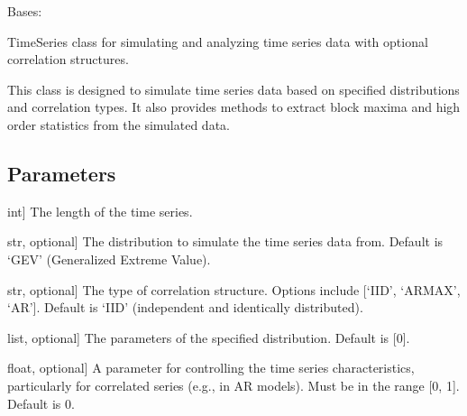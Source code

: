 \documentclass[a4paper,11pt,openany,english]{sphinxmanual}
\begin{document}
\begin{fulllineitems}
\label{\detokenize{api_topt:xtremes.topt.TimeSeries}}
\pysigstartsignatures
{}
\pysigstopsignatures
\sphinxAtStartPar
Bases: 

\sphinxAtStartPar
TimeSeries class for simulating and analyzing time series data with optional correlation structures.

\sphinxAtStartPar
This class is designed to simulate time series data based on specified distributions and correlation types. 
It also provides methods to extract block maxima and high order statistics from the simulated data.


\subsection{Parameters}
\label{\detokenize{api_topt:parameters}}\begin{description}
\sphinxlineitem{n}{[}int{]}
\sphinxAtStartPar
The length of the time series.

\sphinxlineitem{distr}{[}str, optional{]}
\sphinxAtStartPar
The distribution to simulate the time series data from. Default is ‘GEV’ (Generalized Extreme Value).

\sphinxlineitem{correlation}{[}str, optional{]}
\sphinxAtStartPar
The type of correlation structure. Options include {[}‘IID’, ‘ARMAX’, ‘AR’{]}. Default is ‘IID’ 
(independent and identically distributed).

\sphinxlineitem{modelparams}{[}list, optional{]}
\sphinxAtStartPar
The parameters of the specified distribution. Default is {[}0{]}.

\sphinxlineitem{ts}{[}float, optional{]}
\sphinxAtStartPar
A parameter for controlling the time series characteristics, particularly for correlated series (e.g., in AR models).
Must be in the range {[}0, 1{]}. Default is 0.


\end{description}
\end{fulllineitems}
\end{document}
